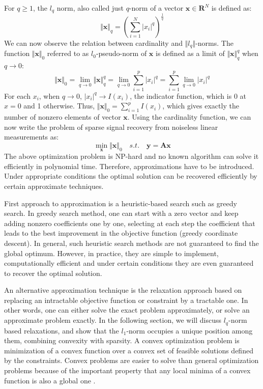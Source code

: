\documentclass[journal]{IEEEtran}
\begin{document}
For $q\ge 1$, the $l_q$ norm, also called just $q$-norm of a vector $\boldsymbol{x}\in\mathbf{R}^N$ is defined as:
%
\begin{equation}
\Vert \boldsymbol{x}\Vert_q=(\sum\limits_{i=1}^N\vert x_i\vert^q)^\frac{1}{q}
\end{equation}
%
We can now observe the relation between cardinality and $\Vert l_q\Vert$-norms. The function $\Vert \boldsymbol{x}\Vert_0$ referred to as $l_0$-pseudo-norm of $\boldsymbol{x}$ is defined as a limit of $\Vert \boldsymbol{x}\Vert_q^q$ when $q\to0$:
%
\begin{equation}
\Vert \boldsymbol{x}\Vert_0=\lim\limits_{q\to 0}\Vert \boldsymbol{x}\Vert_q^q=\lim\limits_{q\to 0}\sum\limits_{i=1}^p\vert x_i\vert^q=\sum\limits_{i=1}^p\lim\limits_{q\to 0}\vert x_i\vert^q
\end{equation}
%
For each $x_i$, when $q\to 0$, $\vert x_i\vert^q\to I(x_i)$, the indicator function, which is 0 at $x=0$ and 1 otherwise. Thus, $\Vert \boldsymbol{x}\Vert_0=\sum\limits_{i=1}^p I(x_i)$, which gives exactly the number of nonzero elements of vector $\boldsymbol{x}$. Using the cardinality function, we can now write the problem of sparse signal recovery from noiseless linear measurements as:
%
\begin{equation}
\min_{\boldsymbol{x}}\Vert \boldsymbol{x}\Vert_0 \quad s.t. \quad \boldsymbol{y}=\boldsymbol{A} \boldsymbol{x}
\end{equation}
%
The above optimization problem is NP-hard and no known algorithm can solve it efficiently in polynomial time. Therefore, approximations have to be introduced. Under appropriate conditions the optimal solution can be recovered efficiently by certain approximate techniques.

First approach to approximation is a heuristic-based search such as greedy search. In greedy search method, one can start with a zero vector and keep adding nonzero coefficients one by one, selecting at each step the coefficient that leads to the best improvement in the objective function (greedy coordinate descent). In general, such heuristic search methods are not guaranteed to find the global optimum. However, in practice, they are simple to implement, computationally efficient and under certain conditions they are even guaranteed to recover the optimal solution.

An alternative approximation technique is the relaxation approach based on replacing an intractable objective function or constraint by a tractable one. In other words, one can either solve the exact problem approximately, or solve an approximate problem exactly. In the following section, we will discuss $l_q$-norm based relaxations, and show that the $l_1$-norm occupies a unique position among them, combining convexity with sparsity. A convex optimization problem is minimization of a convex function over a convex set of feasible solutions defined by the constraints. Convex problems are easier to solve than general optimization problems because of the important property that any local minima of a convex function is also a global one \cite{Rish2015}.
\end{document}
